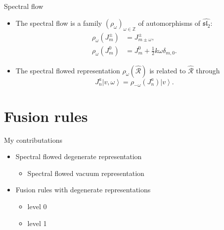 \documentclass{beamer}
\begin{document}
\begin{frame}{Spectral flow}
  \begin{itemize}
    \item The spectral flow is a family $(\rho_{\omega})_{\omega \in \mathbb{Z}}$ of automorphisms of $\widehat{\mathfrak{sl}_{2}}$: 
      \begin{equation*}
          \begin{aligned}
              \rho_{\omega}(J^{\pm}_{m}) & = J^{\pm}_{m \pm \omega},\\
              \rho_{\omega}(J^{0}_{m}) & = J^{0}_{m} + \frac{1}{2} k \omega \delta_{m,0}.
          \end{aligned}
      \end{equation*}
    \item The spectral flowed representation $\rho_{\omega}\left(\widehat{\mathcal{R}}\right)$ is related to
     $\widehat{\mathcal{R}}$ through
     \begin{equation*}
        J^{a}_{n} \left|v, \omega \right\rangle = \rho_{-\omega}\left(J^{a}_{n}\right) \left|v \right\rangle.
     \end{equation*}
  \end{itemize}
\end{frame}

\section{Fusion rules}

\begin{frame}{My contributations}
  \begin{itemize}
    \item Spectral flowed degenerate representation
        \begin{itemize}
          \item Spectral flowed vacuum representation
        \end{itemize}
    \item Fusion rules with degenerate representations
        \begin{itemize}
          \item level 0 
          \item level 1 
        \end{itemize}
  \end{itemize}
\end{frame}
\end{document}
